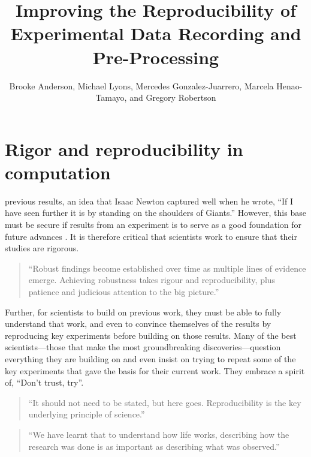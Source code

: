 \documentclass[]{tufte-book}
\title{Improving the Reproducibility of Experimental Data Recording and Pre-Processing}
\author{Brooke Anderson, Michael Lyons, Mercedes Gonzalez-Juarrero, Marcela Henao-Tamayo, and Gregory Robertson}
\date{}
\begin{document}
\maketitle



{
\setcounter{tocdepth}{1}
\tableofcontents
}

\chapter{Rigor and reproducibility in computation}\label{rigor-and-reproducibility-in-computation}

 previous results, an idea that
Isaac Newton captured well when he wrote, ``If I have seen further it is by
standing on the shoulders of Giants.'' However, this base must be secure if
results from an experiment is to serve as a good foundation for future advances
\citep{garraway2017remember}. It is therefore critical that scientists work to ensure
that their studies are rigorous.

\begin{quote}
``Robust findings become established over time as multiple lines of evidence
emerge. Achieving robustness takes rigour and reproducibility, plus patience
and judicious attention to the big picture.'' \citep{garraway2017remember}
\end{quote}

Further, for scientists to build on previous work, they must be able to fully
understand that work, and even to convince themselves of the results by
reproducing key experiments before building on those results. Many of the
best scientists---those that make the most groundbreaking discoveries---question
everything they are building on and even insist on trying to repeat some of
the key experiments that gave the basis for their current work. They embrace
a spirit of, ``Don't trust, try''.

\begin{quote}
``It should not need to be stated, but here goes. Reproducibility is the key
underlying principle of science.'' \citep{gibb2014reproducibility}
\end{quote}

\begin{quote}
``We have learnt that to understand how life works, describing how the research
was done is as important as describing what was observed.'' \citep{lithgow2017long}
\end{quote}
\end{document}
